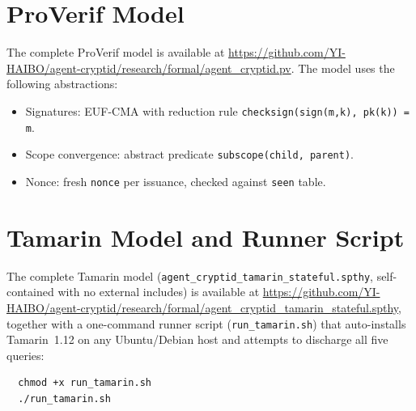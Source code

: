 \documentclass[10pt,twocolumn]{IEEEtran}
\begin{document}
\begin{appendices}
\section{ProVerif Model}
\label{app:proverif}

The complete ProVerif model is available at
\url{https://github.com/YI-HAIBO/agent-cryptid/research/formal/agent\_cryptid.pv}.
The model uses the following abstractions:
\begin{itemize}
  \item Signatures: EUF-CMA with reduction rule
    \texttt{checksign(sign(m,k), pk(k)) = m}.
  \item Scope convergence: abstract predicate \texttt{subscope(child, parent)}.
  \item Nonce: fresh \texttt{nonce} per issuance, checked against \texttt{seen} table.
\end{itemize}

\section{Tamarin Model and Runner Script}
\label{app:tamarin}

The complete Tamarin model
(\texttt{agent\_cryptid\_tamarin\_stateful.spthy}, self-contained with
no external includes) is available at
\url{https://github.com/YI-HAIBO/agent-cryptid/research/formal/agent\_cryptid\_tamarin\_stateful.spthy},
together with a one-command runner script
(\texttt{run\_tamarin.sh}) that auto-installs Tamarin~1.12 on any
Ubuntu/Debian host and attempts to discharge all five queries:

\begin{verbatim}
  chmod +x run_tamarin.sh
  ./run_tamarin.sh
\end{verbatim}


\end{appendices}
\end{document}
